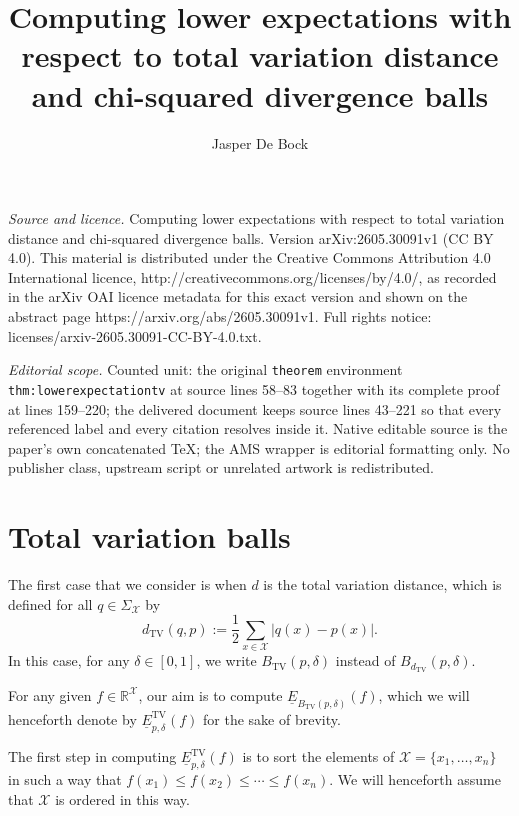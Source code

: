 \documentclass[10pt,a4paper]{amsart}
\begin{document}
\title[Computing lower expectations with respect to total variation]{Computing lower expectations with respect to total variation distance and chi-squared divergence balls}
\author{Jasper De Bock}
\date{}
\maketitle
\noindent\emph{Source and licence.} Computing lower expectations with respect to total variation distance and chi-squared divergence balls. Version arXiv:2605.30091v1 (CC BY 4.0). This material is distributed under the Creative Commons Attribution 4.0 International licence, http://creativecommons.org/licenses/by/4.0/, as recorded in the arXiv OAI licence metadata for this exact version and shown on the abstract page https://arxiv.org/abs/2605.30091v1. Full rights notice: licenses/arxiv-2605.30091-CC-BY-4.0.txt.\par\smallskip
\noindent\textit{Editorial scope.} Counted unit: the original \texttt{theorem} environment \texttt{thm:lowerexpectationtv} at source lines 58--83 together with its complete proof at lines 159--220; the delivered document keeps source lines 43--221 so that every referenced label and every citation resolves inside it. Native editable source is the paper's own concatenated TeX; the AMS wrapper is editorial formatting only. No publisher class, upstream script or unrelated artwork is redistributed.
\section{Total variation balls}\label{sec:tv}

The first case that we consider is when $d$ is the total variation distance, which is defined for all $q\in\Sigma_\mathcal{X}$ by
\begin{equation*}
    d_\mathrm{TV}(q,p):=\frac{1}{2}\sum_{x\in\mathcal{X}}|q(x)-p(x)|.
\end{equation*}
In this case, for any $\delta\in[0,1]$, we write $B_\mathrm{TV}(p,\delta)$ instead of $B_{d_\mathrm{TV}}(p,\delta)$.

For any given $f\in\mathbb{R}^\mathcal{X}$, our aim is to compute $\underline{E}_{B_\mathrm{TV}(p,\delta)}(f)$, which we will henceforth denote by $\underline{E}^\mathrm{TV}_{p,\delta}(f)$ for the sake of brevity.

The first step in computing $\underline{E}^\mathrm{TV}_{p,\delta}(f)$ is to sort the elements of $\mathcal{X}=\{x_1,\ldots,x_n\}$ in such a way that $f(x_1)\leq f(x_2)\leq\cdots\leq f(x_n)$. We will henceforth assume that $\mathcal{X}$ is ordered in this way.
\end{document}
